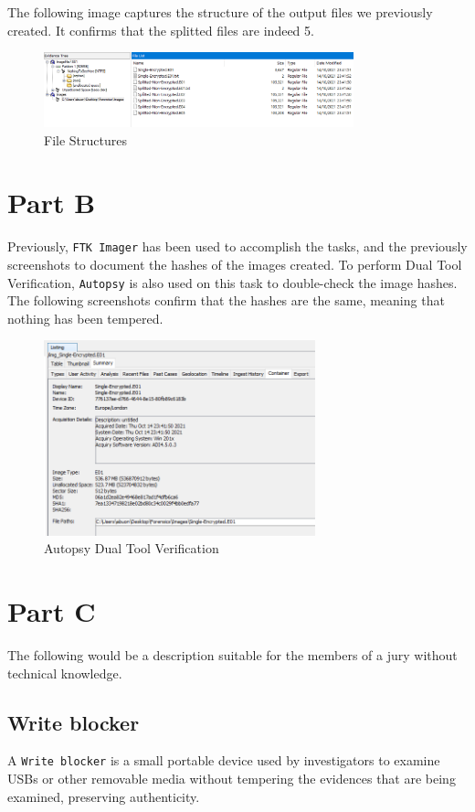 The following image captures the structure of the output files we previously
created. It confirms that the splitted files are indeed 5.

\begin{figure}[H]
  \centering
  \includegraphics[width=0.8\textwidth]{figures/folder-structure}
  \caption{File Structures}
  \label{f:folder-structure}
\end{figure}

\section{Part B}
\label{s:task1-part-b}
Previously, \lstinline{FTK Imager} has been used to accomplish the tasks, and
the previously screenshots to document the hashes of the images created. To
perform Dual Tool Verification, \lstinline{Autopsy} is also used on this task to
double-check the image hashes. The following screenshots confirm that the hashes
are the same, meaning that nothing has been tempered.

\begin{figure}[H]
  \centering
  \includegraphics[width=0.7\textwidth]{figures/autopsy-hashes}
  \caption{Autopsy Dual Tool Verification}
  \label{f:autopsy-hashes}
\end{figure}

\newpage
\section{Part C}
\label{s:task1-part-c}
The following would be a description suitable for the members of a jury without
technical knowledge.

\subsection{Write blocker}
\label{s:write-blocker}
A \lstinline{Write blocker} is a small portable device used by investigators to examine USBs
or other removable media without tempering the evidences that are being examined,
preserving authenticity.
